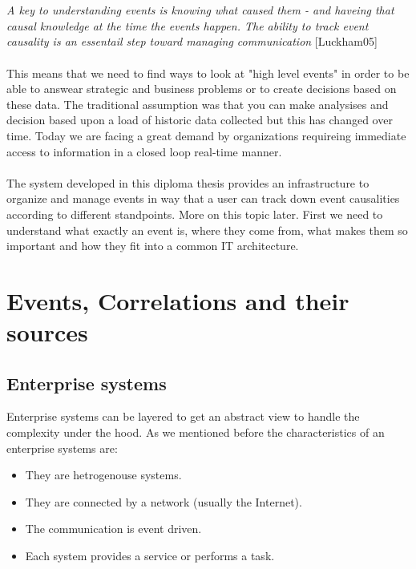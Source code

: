 \documentclass[a4paper,titlepage,11pt,DIV10,BCOR0.5cm,headinclude]{article}
\begin{document}
\\\\
\textit{A key to understanding events is knowing what caused them - and haveing that causal knowledge at the time the events happen. The ability to track event causality is an essentail step toward managing communication} [Luckham05]
\\\\
This means that we need to find ways to look at "high level events" in order to be able to answear strategic and business problems or to create decisions based on these data. The traditional assumption was that you can make analysises and decision based upon a load of historic data collected but this has changed over time. Today we are facing a great demand by organizations requireing immediate access to information in a closed loop real-time manner. 
\\\\
The system developed in this diploma thesis provides an infrastructure to organize and manage events in way that a user can track down event causalities according to different standpoints. More on this topic later. First we need to understand what exactly an event is, where they come from, what makes them so important and how they fit into a common IT architecture.

\section{Events, Correlations and their sources}

\subsection{Enterprise systems}
Enterprise systems can be layered to get an abstract view to handle the complexity under the hood. As we mentioned before the characteristics of an enterprise systems are:
\begin{itemize}
	\item They are hetrogenouse systems.
	\item They are connected by a network (usually the Internet).
	\item The communication is event driven.
	\item Each system provides a service or performs a task.
\end{itemize}
\end{document}
